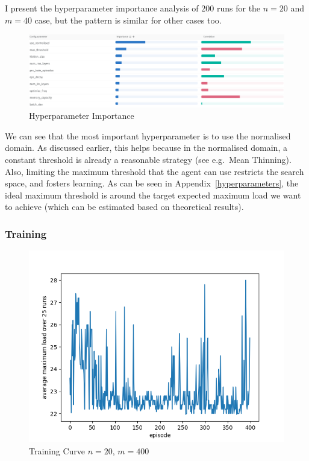 I present the hyperparameter importance analysis of $200$ runs for the $n=20$ and $m=40$ case, but the pattern is similar for other cases too.


\begin{figure}[hbt!] \label{two-thinning-hyperparameter-importance}
    \centering
    \includegraphics[scale=0.4]{Chapter4/Figs/Hyperparameter_importance_20_400.png}
    \caption{\TwoThinning Hyperparameter Importance \cite{biewald2020wandb}}
\end{figure}
We can see that the most important hyperparameter is to use the normalised domain. As discussed earlier, this helps because in the normalised domain, a constant threshold is already a reasonable strategy (see e.g.\ Mean Thinning). Also, limiting the maximum threshold that the agent can use restricts the search space, and fosters learning. As can be seen in Appendix~\ref{hyperparameters}, the ideal maximum threshold is around the target expected maximum load we want to achieve (which can be estimated based on theoretical results).



\subsubsection{Training}


\begin{figure}[hbt!] \label{two-thinning-training-curve}
    \centering
    \includegraphics[scale=1.0]{Chapter4/Figs/training_progression_20_400.png}
    \caption{\TwoThinning Training Curve $n=20$, $m=400$}
\end{figure}

